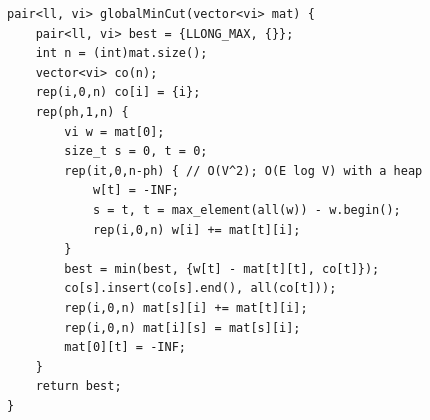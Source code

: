 \begin{lstlisting}
pair<ll, vi> globalMinCut(vector<vi> mat) {
    pair<ll, vi> best = {LLONG_MAX, {}};
    int n = (int)mat.size();
    vector<vi> co(n);
    rep(i,0,n) co[i] = {i};
    rep(ph,1,n) {
        vi w = mat[0];
        size_t s = 0, t = 0;
        rep(it,0,n-ph) { // O(V^2); O(E log V) with a heap
            w[t] = -INF;
            s = t, t = max_element(all(w)) - w.begin();
            rep(i,0,n) w[i] += mat[t][i];
        }
        best = min(best, {w[t] - mat[t][t], co[t]});
        co[s].insert(co[s].end(), all(co[t]));
        rep(i,0,n) mat[s][i] += mat[t][i];
        rep(i,0,n) mat[i][s] = mat[s][i];
        mat[0][t] = -INF;
    }
    return best;
}
\end{lstlisting}
